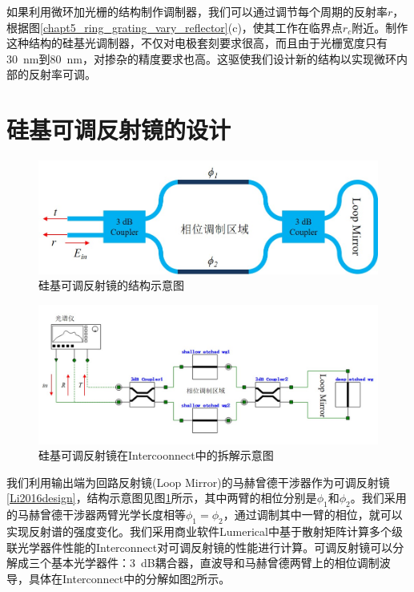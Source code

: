 如果利用微环加光栅的结构制作调制器，我们可以通过调节每个周期的反射率$r$，根据图\ref{chapt5_ring_grating_vary_reflector}(c)，使其工作在临界点$r_c$附近。制作这种结构的硅基光调制器，不仅对电极套刻要求很高，而且由于光栅宽度只有30~nm到80~nm，对掺杂的精度要求也高。这驱使我们设计新的结构以实现微环内部的反射率可调。
\section{硅基可调反射镜的设计}
\begin{figure}[htb]
	\centering
	\includegraphics[width=12cm]{./Pictures/chapt5_tunable_reflection_mirror.jpg}
	\caption{硅基可调反射镜的结构示意图}
	\label{chapt5_tunable_reflection_mirror}
\end{figure}
\begin{figure}[htb]
	\centering
	\includegraphics[width=15cm]{./Pictures/chapt5_tunable_reflection_mirror_inter.jpg}
	\caption{硅基可调反射镜在Intercoonnect\cite{interconnect}中的拆解示意图}
	\label{chapt5_tunable_reflection_mirror_inter}
\end{figure}
我们利用输出端为回路反射镜(Loop Mirror)的马赫曾德干涉器作为可调反射镜\ref{Li2016design}，结构示意图见图\ref{chapt5_tunable_reflection_mirror}所示，其中两臂的相位分别是$\phi_1$和$\phi_2$。我们采用的马赫曾德干涉器两臂光学长度相等$\phi_1 = \phi_2$，通过调制其中一臂的相位，就可以实现反射谱的强度变化。我们采用商业软件Lumerical中基于散射矩阵计算多个级联光学器件性能的Interconnect\cite{interconnect}对可调反射镜的性能进行计算。可调反射镜可以分解成三个基本光学器件：3~dB耦合器，直波导和马赫曾德两臂上的相位调制波导，具体在Interconnect中的分解如图\ref{chapt5_tunable_reflection_mirror_inter}所示。
